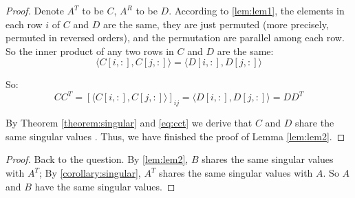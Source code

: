 \begin{proof}
Denote $A^T$ to be $C$,  $A^R$ to be $D$.
According to \ref{lem:lem1},
the elements in each row $i$ of $C$ and $D$ are the same,
they are just permuted (more precisely, permuted in reversed orders), and the permutation are parallel among each row. So the inner product of any two rows in $C$ and $D$ are the same:
\begin{equation*}
    \langle C[i,:], C[j,:] \rangle = \langle D[i,:], D[j,:] \rangle
\end{equation*}

So: 
\begin{equation}
    \label{eq:cct}
    CC^T = [\langle C[i,:], C[j,:] \rangle]_{ij} = 
    \langle D[i,:], D[j,:] \rangle = DD^T
\end{equation}

By Theorem \ref{theorem:singular} and \eqref{eq:cct} we derive that $C$ and $D$ share the same singular values . Thus, we have finished the proof of Lemma \ref{lem:lem2}.
\end{proof}

\begin{proof}
Back to the question. By \ref{lem:lem2}, $B$ shares the same singular values with $A^T$; By \ref{corollary:singular}, $A^T$ shares the same singular values with $A$. So  $A$ and $B$ have the same singular values.
\end{proof}



